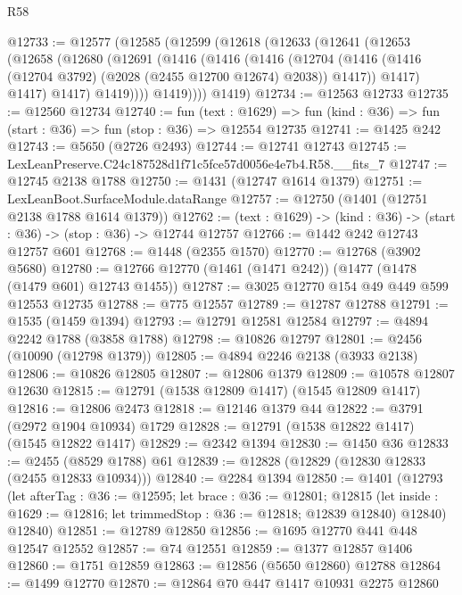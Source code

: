 \begin{lexlean}{R58}
\begin{coremodule}
{{@12733 := @12577
    (@12585
      (@12599
        (@12618
          (@12633
            (@12641
              (@12653
                (@12658
                  (@12680
                    (@12691
                      (@1416
                        (@1416
                          (@1416
                            (@12704
                              (@1416
                                (@1416 (@12704 @3792) (@2028 (@2455 @12700 @12674) @2038))
                                @1417))
                            @1417)
                          @1417)
                        @1417)
                      @1419))))
              @1419))))
      @1419)
@12734 := @12563 @12733
@12735 := @12560 @12734
@12740 := fun (text : @1629) =>
  fun (kind : @36) => fun (start : @36) => fun (stop : @36) => @12554 @12735
@12741 := @1425 @242
@12743 := @5650 (@2726 @2493)
@12744 := @12741 @12743
@12745 := LexLeanPreserve.C24c187528d1f71c5fce57d0056e4e7b4.R58.__fits_7
@12747 := @12745 @2138 @1788
@12750 := @1431 (@12747 @1614 @1379)
@12751 := LexLeanBoot.SurfaceModule.dataRange
@12757 := @12750 (@1401 (@12751 @2138 @1788 @1614 @1379))
@12762 := (text : @1629) -> (kind : @36) -> (start : @36) -> (stop : @36) -> @12744 @12757
@12766 := @1442 @242 @12743 @12757 @601
@12768 := @1448 (@2355 @1570)
@12770 := @12768 (@3902 @5680)
@12780 := @12766 @12770 (@1461 (@1471 @242)) (@1477 (@1478 (@1479 @601) @12743 @1455))
@12787 := @3025 @12770 @154 @49 @449 @599 @12553 @12735
@12788 := @775 @12557
@12789 := @12787 @12788
@12791 := @1535 (@1459 @1394)
@12793 := @12791 @12581 @12584
@12797 := @4894 @2242 @1788 (@3858 @1788)
@12798 := @10826 @12797
@12801 := @2456 (@10090 (@12798 @1379))
@12805 := @4894 @2246 @2138 (@3933 @2138)
@12806 := @10826 @12805
@12807 := @12806 @1379
@12809 := @10578 @12807 @12630
@12815 := @12791 (@1538 @12809 @1417) (@1545 @12809 @1417)
@12816 := @12806 @2473
@12818 := @12146 @1379 @44
@12822 := @3791 (@2972 @1904 @10934) @1729
@12828 := @12791 (@1538 @12822 @1417) (@1545 @12822 @1417)
@12829 := @2342 @1394
@12830 := @1450 @36
@12833 := @2455 (@8529 @1788) @61
@12839 := @12828 (@12829 (@12830 @12833 (@2455 @12833 @10934)))
@12840 := @2284 @1394
@12850 := @1401
    (@12793
      (let afterTag : @36 := @12595;
      let brace : @36 := @12801;
      @12815 (let inside : @1629 := @12816; let trimmedStop : @36 := @12818; @12839 @12840) @12840)
      @12840)
@12851 := @12789 @12850
@12856 := @1695 @12770 @441 @448 @12547 @12552
@12857 := @74 @12551
@12859 := @1377 @12857 @1406
@12860 := @1751 @12859
@12863 := @12856 (@5650 @12860) @12788
@12864 := @1499 @12770
@12870 := @12864 @70 @447 @1417 @10931 @2275 @12860
}}
\end{coremodule}
\end{lexlean}

